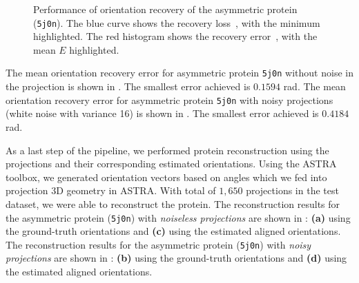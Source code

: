 \begin{figure}[ht!]
    \caption{%
        Performance of orientation recovery of the asymmetric protein (\texttt{5j0n}).
        The blue curve shows the recovery loss~, with the minimum highlighted.
        The red histogram shows the recovery error~, with the mean $E$ highlighted.
    }\label{fig:5j0n-orientation-recovery-loss-est}
\end{figure}

The mean orientation recovery error for asymmetric protein \texttt{5j0n} without noise in the projection is shown in .
The smallest error achieved is $0.1594$ rad.
The mean orientation recovery error for asymmetric protein \texttt{5j0n} with noisy projections (white noise with variance 16) is shown in .
The smallest error achieved is $0.4184$ rad.

As a last step of the pipeline, we performed protein reconstruction using the projections and their corresponding estimated orientations.
Using the ASTRA toolbox, we generated orientation vectors based on angles which we fed into projection 3D geometry in ASTRA.
With total of $1,650$ projections in the test dataset, we were able to reconstruct the protein.
The reconstruction results for the asymmetric protein (\texttt{5j0n}) with \textit{noiseless projections} are shown in : \textbf{(a)} using the ground-truth orientations and \textbf{(c)} using the estimated aligned orientations.
The reconstruction results for the asymmetric protein (\texttt{5j0n}) with \textit{noisy projections} are shown in : \textbf{(b)} using the ground-truth orientations and \textbf{(d)} using the estimated aligned orientations.


